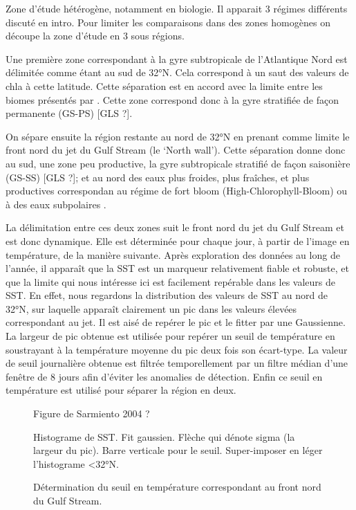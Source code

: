 Zone d'étude hétérogène, notamment en biologie.
Il apparait 3 régimes différents discuté en intro.
Pour limiter les comparaisons dans des zones homogènes on découpe la zone d'étude en 3 sous régions.

Une première zone correspondant à la gyre subtropicale de l'Atlantique Nord est délimitée comme étant au sud de 32°N.
Cela correspond à un saut des valeurs de \gls{chla} à cette latitude.
Cette séparation est en accord avec la limite entre les biomes présentés par \cite{sarmiento_2004}.
Cette zone correspond donc à la gyre stratifiée de façon permanente (GS-PS) [GLS ?].

On sépare ensuite la région restante au nord de 32°N en prenant comme limite le front nord du jet du Gulf Stream (le `North wall'). Cette séparation donne donc au sud, une zone peu productive, la gyre subtropicale stratifié de façon saisonière (GS-SS) [GLS ?]; et au nord des eaux plus froides, plus fraîches, et plus productives correspondan au régime de fort bloom (High-Chlorophyll-Bloom)  ou à des eaux subpolaires .

La délimitation entre ces deux zones suit le front nord du jet du Gulf Stream et est donc dynamique. Elle est déterminée pour chaque jour, à partir de l'image en température, de la manière suivante.
Après exploration des données au long de l'année, il apparaît que la SST est un marqueur relativement fiable et robuste, et que la limite qui nous intéresse ici est facilement repérable dans les valeurs de SST.
En effet, nous regardons la distribution des valeurs de SST au nord de 32°N, sur laquelle apparaît clairement un pic dans les valeurs élevées correspondant au jet.
Il est aisé de repérer le pic et le fitter par une Gaussienne. La largeur de pic obtenue est utilisée pour repérer un seuil de température en soustrayant à la température moyenne du pic deux fois son écart-type.
La valeur de seuil journalière obtenue est filtrée temporellement par un filtre médian d'une fenêtre de 8 jours afin d'éviter les anomalies de détection.
Enfin ce seuil en température est utilisé pour séparer la région en deux.

\begin{figure}
  \caption{Figure de Sarmiento 2004 ?}
  \label{fig:sarmiento}
\end{figure}

\begin{figure}
  Histograme de SST. Fit gaussien. Flèche qui dénote sigma (la largeur du pic).
  Barre verticale pour le seuil.
  Super-imposer en léger l'histograme <32°N.
  \caption{Détermination du seuil en température correspondant au front nord du Gulf Stream.}
  \label{fig:seuil-temp}
\end{figure}


